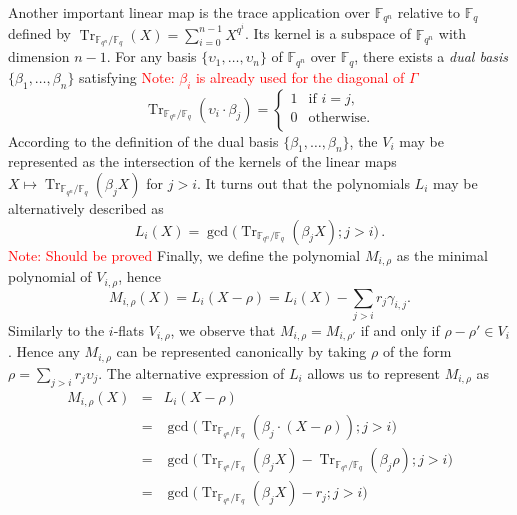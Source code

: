 \documentclass{article}
\newcommand{\ff}[1]{\mathbb{F}_{#1}}
\newcommand{\qq}{q}
\newcommand{\nn}{n}
\newcommand{\qn}{{\qq^\nn}}
\newcommand{\basef}{\ff{\qq}}
\newcommand{\extf}{\ff{\qn}}
\DeclareMathOperator{\Tr}{Tr}
\DeclareMathOperator{\Ker}{Ker}
\newcommand{\Notes}[1]{\textcolor{red}{Note: #1}}
\begin{document}
Another important linear map is the trace application over $\extf$ relative to $\basef$ defined by $\Tr_{\extf/\basef}(X)=\sum_{i=0}^{n-1} X^{\qq^i}$. Its kernel is a subspace of $\extf$ with dimension $n-1$. For any basis $\{\upsilon_1,\ldots,\upsilon_\nn\}$ of $\extf$ over $\basef$, there exists a \emph{dual basis} $\{\beta_1,\ldots,\beta_\nn\}$ satisfying
\Notes{$\beta_i$ is already used for the diagonal of $\Gamma$}
$$
\Tr_{\extf/\basef}(\upsilon_i \cdot \beta_j)=
\left\{
\begin{array}{ll}
1 & \mbox{if } i=j, \\
0 &  \mbox{otherwise}. \\
\end{array}
\right.
$$
According to the definition of the dual  basis $\{\beta_1,\ldots,\beta_\nn\}$, the $V_i$ may be represented as 
the intersection of the kernels of the linear maps $X \mapsto \Tr_{\extf/\basef}(\beta_j X )$ for $j>i$. It turns out that the polynomials 
 $L_i$ may be alternatively described as
 \begin{equation}
 \label{L_i_alt_formula}
 L_i(X)=\gcd\bigl(\Tr_{\extf/\basef}(\beta_j X );j>i\bigr) \,.
 \end{equation}
 \Notes{Should be proved}
Finally, we define the polynomial $M_{i,\rho}$ as the minimal
polynomial of $V_{i,\rho}$, hence
\begin{equation}
  M_{i,\rho}(X) = L_i(X - \rho) = L_i(X) - \sum_{j>i}r_j\gamma_{i,j}.
\end{equation}
Similarly to the $i$-flats $V_{i,\rho}$, we observe that $M_{i,\rho}=M_{i,\rho'}$ if and only if $\rho-\rho'\in V_i$. Hence
any $M_{i,\rho}$ can be represented canonically by taking $\rho$ of
the form $\rho=\sum_{j>i}r_j\upsilon_j$. The alternative expression of $L_i$ allows us to represent $M_{i,\rho}$ as
\begin{equation}
\label{alternative_M_i_rho}
\begin{array}{lll}
M_{i,\rho}(X)&=& L_i(X-\rho) \\
&=&\gcd\bigl(\Tr_{\extf/\basef}(\beta_j \cdot  (X-\rho) );j>i\bigr)  \\
&=& \gcd\bigl(\Tr_{\extf/\basef}(\beta_j X) -\Tr_{\extf/\basef}(\beta_j \rho) ;j>i\bigr)  \\
&=&  \gcd\bigl(\Tr_{\extf/\basef}(\beta_j X) -r_j ;j>i\bigr)  \\
\end{array}
\end{equation}
\end{document}
